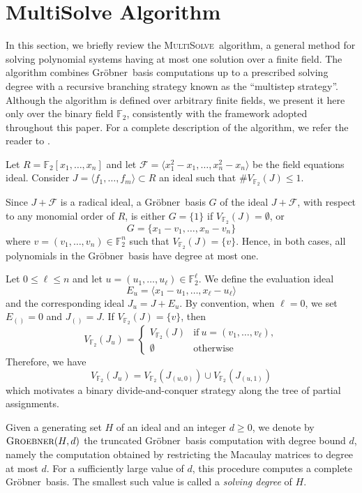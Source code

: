 \documentclass{amsart}
\def\FF{{\mathbb F}}
\def\Gr{Gr\"obner}
\def\GB{{\textsc{Groebner}}}
\def\MultiSolve{{\textsc{MultiSolve}}}
\def\cF{{\mathcal{F}}}
\begin{document}
\section{MultiSolve Algorithm}

In this section, we briefly review the \MultiSolve\ algorithm, a general method
for solving polynomial systems having at most one solution over a finite field.
The algorithm combines \Gr\ basis computations up to a prescribed solving degree
with a recursive branching strategy known as the ``multistep strategy''. Although
the algorithm is defined over arbitrary finite fields, we present it here only
over the binary field $\FF_2$, consistently with the framework adopted throughout
this paper. For a complete description of the algorithm, we refer the reader
to \cite{LST}.

Let $R = \FF_2[x_1,\ldots,x_n]$ and let $\cF = \langle x_1^2 - x_1,\ldots,x_n^2 - x_n \rangle$
be the field equations ideal. Consider $J = \langle f_1,\ldots,f_m \rangle\subset R$ an ideal
such that $\# V_{\FF_2}(J)\leq 1$.

Since $J + \cF$ is a radical ideal, a \Gr\ basis $G$ of the ideal $J + \cF$, with respect
to any monomial order of $R$, is either $G = \{1\}$ if $V_{\FF_2}(J) = \emptyset$, or
\[
G = \{x_1 - v_1,\ldots,x_n - v_n\}
\]
where $v = (v_1,\ldots,v_n)\in\FF_2^n$ such that $V_{\FF_2}(J) = \{v\}$.
Hence, in both cases, all polynomials in the \Gr\ basis have degree at most one.

Let $0\leq \ell \leq n$ and let $u = (u_1,\ldots,u_\ell)\in\FF_2^\ell$. We define
the evaluation ideal
\[
E_u = \langle x_1 - u_1, \ldots, x_\ell - u_\ell \rangle
\]
and the corresponding ideal $J_u = J + E_u$. By convention, when $\ell = 0$,
we set $E_{()} = 0$ and $J_{()} = J$. If $V_{\FF_2}(J) = \{v\}$, then
\[
V_{\FF_2}(J_u) =
\left\{
\begin{array}{cl}
V_{\FF_2}(J) & \mbox{if}\ u = (v_1,\ldots,v_\ell), \\
\emptyset & \mbox{otherwise}
\end{array}
\right.
\]
Therefore, we have
\[
V_{\FF_2}(J_u) = V_{\FF_2}(J_{(u,0)}) \cup V_{\FF_2}(J_{(u,1)})
\]
which motivates a binary divide-and-conquer strategy along the tree of partial assignments.

Given a generating set $H$ of an ideal and an integer $d\geq0$, we denote by
$\GB(H,d)$ the truncated \Gr\ basis computation with degree bound $d$, namely
the computation obtained by restricting the Macaulay matrices to degree
at most $d$. For a sufficiently large value of $d$, this procedure computes a complete
\Gr\ basis. The smallest such value is called a {\em solving degree} of $H$.
\end{document}
